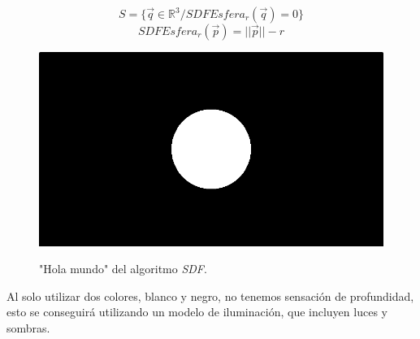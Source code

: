 \[S=\{\Vec{q} \in \mathbb{R}^3 / SDFEsfera_r(\Vec{q})=0\}\]
\[ SDFEsfera_r(\Vec{p})=\vert\vert\Vec{p}\vert\vert - r  \]
\begin{figure}[H]
  \centering
  \captionsetup{justification=centering}%
  \includegraphics[width=1.0\textwidth]{secciones/imagenes/starting/sdf1.png}\label{fig:hello}
  \caption{"Hola mundo" del algoritmo \textit{SDF}.}
\end{figure}


Al solo utilizar dos colores, blanco y negro, no tenemos sensación de profundidad, esto se conseguirá utilizando un modelo de iluminación, que incluyen luces y sombras.